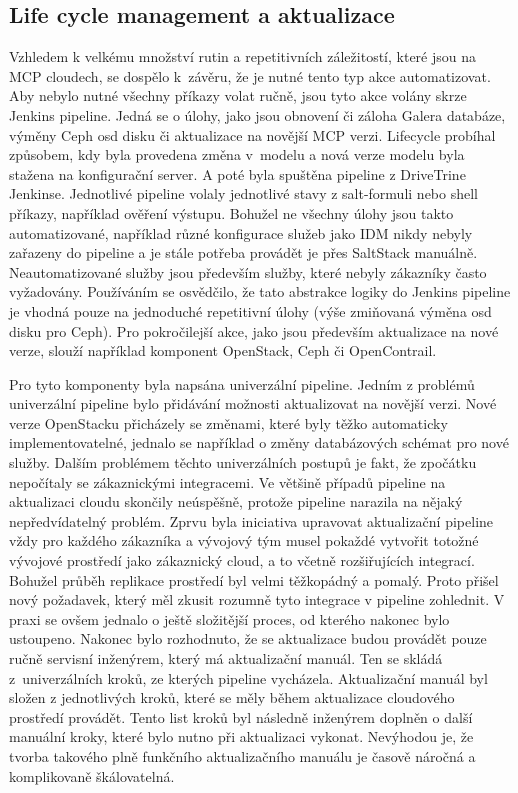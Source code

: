 \subsection{Life cycle management a aktualizace}
Vzhledem k velkému množství rutin a repetitivních záležitostí, které jsou na MCP cloudech, se dospělo k závěru, že je nutné tento typ akce automatizovat. Aby nebylo nutné všechny příkazy volat ručně, jsou tyto akce volány skrze Jenkins pipeline. Jedná se o úlohy, jako jsou obnovení či záloha Galera databáze, výměny Ceph osd disku či aktualizace na novější MCP verzi. Lifecycle probíhal způsobem, kdy byla provedena změna v modelu a nová verze modelu byla stažena na konfigurační server. A poté byla spuštěna pipeline z DriveTrine Jenkinse. Jednotlivé pipeline volaly jednotlivé stavy z salt-formuli nebo shell příkazy, například ověření výstupu. Bohužel ne všechny úlohy jsou takto automatizované, například různé konfigurace služeb jako IDM nikdy nebyly zařazeny do pipeline a je stále potřeba provádět je přes SaltStack manuálně. Neautomatizované služby jsou především služby, které nebyly zákazníky často vyžadovány. Používáním se osvědčilo, že tato abstrakce logiky do Jenkins pipeline je vhodná pouze na jednoduché repetitivní úlohy (výše zmiňovaná výměna osd disku pro Ceph). Pro pokročilejší akce, jako jsou především aktualizace na nové verze, slouží například komponent OpenStack, Ceph či OpenContrail.

Pro tyto komponenty byla napsána univerzální pipeline. Jedním z problémů univerzální pipeline bylo přidávání možnosti aktualizovat na novější verzi. Nové verze OpenStacku přicházely se změnami, které byly těžko automaticky implementovatelné, jednalo se například o změny databázových schémat pro nové služby. Dalším problémem těchto univerzálních postupů je fakt, že zpočátku nepočítaly se zákaznickými integracemi. Ve většině případů pipeline na aktualizaci cloudu skončily neúspěšně, protože pipeline narazila na nějaký nepředvídatelný problém. Zprvu byla iniciativa upravovat aktualizační pipeline vždy pro každého zákazníka a vývojový tým musel pokaždé vytvořit totožné vývojové prostředí jako zákaznický cloud, a to včetně rozšiřujících integrací. Bohužel průběh replikace prostředí byl velmi těžkopádný a pomalý. Proto přišel nový požadavek, který měl zkusit rozumně tyto integrace v pipeline zohlednit. V praxi se ovšem jednalo o ještě složitější proces, od kterého nakonec bylo ustoupeno. Nakonec bylo rozhodnuto, že se aktualizace budou provádět pouze ručně servisní inženýrem, který má aktualizační manuál. Ten se skládá z univerzálních kroků, ze kterých pipeline vycházela. Aktualizační manuál byl složen z jednotlivých kroků, které se měly během aktualizace cloudového prostředí provádět. Tento list kroků byl následně inženýrem doplněn o další manuální kroky, které bylo nutno při aktualizaci vykonat. Nevýhodou je, že tvorba takového plně funkčního aktualizačního manuálu je časově náročná a komplikovaně škálovatelná.

